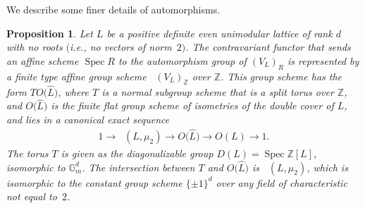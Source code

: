 \documentclass[11pt]{article}
\newcommand{\bG}{\mathbb{G}}
\newcommand{\bZ}{\mathbb{Z}}
\DeclareMathOperator{\uAut}{\underline{Aut}}
\DeclareMathOperator{\uHom}{\underline{Hom}}
\DeclareMathOperator{\Spec}{Spec}
\newtheorem{prop}[thm]{Proposition}
\theoremstyle{definition}
\begin{document}
We describe some finer details of automorphisms.

\begin{prop} \label{prop:automorphism-group-of-standard-R-form}Let $L$ be a positive definite even unimodular lattice of rank $d$ with no roots $($i.e., no vectors of norm~$2)$. The contravariant functor that sends an affine scheme $\Spec R$ to the automorphism group of $(V_L)_R$ is represented by a finite type affine group scheme $\uAut (V_L)_\bZ$ over $\bZ$. This group scheme has the form $T O\big(\hat{L}\big)$, where $T$ is a normal subgroup scheme that is a split torus over $\bZ$, and $O\big(\hat{L}\big)$ is the finite flat group scheme of isometries of the double cover of $L$, and lies in a canonical exact sequence
\begin{gather*} 1 \to \uHom(L,\mu_2) \to O\big(\hat{L}\big) \to O(L) \to 1. \end{gather*}
The torus $T$ is given as the diagonalizable group $D(L) = \Spec \bZ[L]$, isomorphic to $\bG_m^d$. The intersection between $T$ and $O\big(\hat{L}\big)$ is $\uHom(L,\mu_2)$, which is isomorphic to the constant group scheme $\{\pm 1\}^d$ over any field of characteristic not equal to~$2$.
\end{prop}
\end{document}
